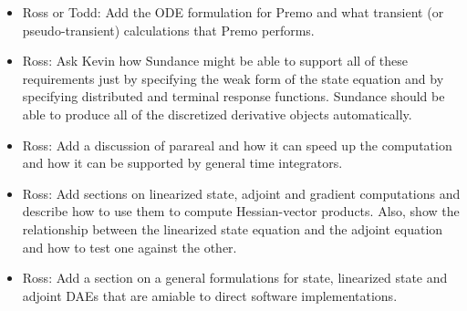 \documentclass[pdf,ps2pdf,11pt]{SANDreport}
\begin{document}
\begin{itemize}
%
%
{}\item Ross or Todd: Add the ODE formulation for Premo and what transient (or
pseudo-transient) calculations that Premo performs.
%
{}\item Ross: Ask Kevin how Sundance might be able to support all of these
requirements just by specifying the weak form of the state equation and by
specifying distributed and terminal response functions.  Sundance should be
able to produce all of the discretized derivative objects automatically.
%
{}\item Ross: Add a discussion of parareal and how it can speed up the
computation and how it can be supported by general time integrators.
%
{}\item Ross: Add sections on linearized state, adjoint and gradient
computations and describe how to use them to compute Hessian-vector products.
Also, show the relationship between the linearized state equation and the
adjoint equation and how to test one against the other.
%
{}\item Ross: Add a section on a general formulations for state, linearized
state and adjoint DAEs that are amiable to direct software implementations.
%
\end{itemize}

\begin{SANDdistribution}
\end{SANDdistribution}
\end{document}
